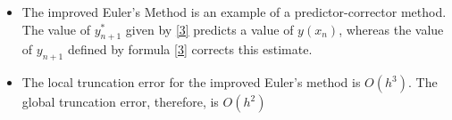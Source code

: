 \documentclass[12pt]{article}
\begin{document}
\begin{itemize}
  \item The improved Euler's Method is an example of a predictor-corrector method. The value of $y^*_{n+1}$ given by \eqref{3} predicts a value of $y(x_n)$, whereas the value of $y_{n+1}$ defined by formula \eqref{3} corrects this estimate. 

  \item The local truncation error for the improved Euler's method is $O(h^3)$. The global truncation error, therefore, is $O(h^2)$

\end{itemize}
\end{document}
